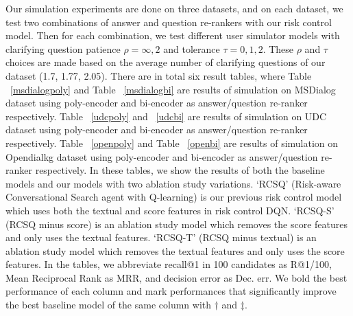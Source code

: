 \documentclass[format=acmsmall, review=False, screen=true]{acmart}
\begin{document}
Our simulation experiments are done on three datasets, and on each dataset, we test two combinations of answer and question re-rankers with our risk control model. Then for each combination, we test different user simulator models with clarifying question patience $\rho=\infty, 2$ and tolerance $\tau=0,1,2$. These $\rho$ and $\tau$ choices are made based on the average number of clarifying questions of our dataset (1.7, 1.77, 2.05). There are in total six result tables, where Table ~\ref{msdialogpoly} and Table ~\ref{msdialogbi} are results of simulation on MSDialog dataset using poly-encoder and bi-encoder as answer/question re-ranker respectively. Table ~\ref{udcpoly} and ~\ref{udcbi} are results of simulation on UDC dataset using poly-encoder and bi-encoder as answer/question re-ranker respectively. Table ~\ref{openpoly} and Table ~\ref{openbi} are results of simulation on Opendialkg dataset using poly-encoder and bi-encoder as answer/question re-ranker respectively. In these tables, we show the results of both the baseline models and our models with two ablation study variations. `RCSQ' (Risk-aware Conversational Search agent with Q-learning) is our previous risk control model which uses both the textual and score features in risk control DQN. `RCSQ-S' (RCSQ minus score) is an ablation study model which removes the score features and only uses the textual features. `RCSQ-T' (RCSQ minus textual) is an ablation study model which removes the textual features and only uses the score features. In the tables, we abbreviate recall@1 in 100 candidates as R@1/100, Mean Reciprocal Rank as MRR, and decision error as Dec. err. We bold the best performance of each column and mark performances that significantly improve the best baseline model of the same column with $\dag$ and $\ddag$.
\end{document}
